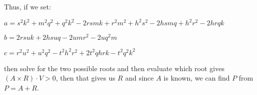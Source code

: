 \documentclass[12pt]{article}
\begin{document}
Thus, if we set:

$%
a=s^{2}k^{2}+m^{2}q^{2}+q^{2}k^{2}-2rsmk+r^{2}m^{2}+h^{2}s^{2}-2hsmq+h^{2}r^{2}-2hrqk 
$

$b=2rsuk+2hsuq-2umr^{2}-2uq^{2}m$

$c=r^{2}u^{2}+u^{2}q^{2}-t^{2}h^{2}r^{2}+2t^{2}qhrk-t^{2}q^{2}k^{2}$

then solve for the two possible roots and then evaluate which root gives $%
(A\times R)\cdot V>0$, then that gives us $R$ and since $A$ is known, we can
find $P$ from $P=A+R$.{}
\end{document}
